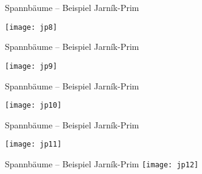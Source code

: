 \begin{frame}{Spannbäume – Beispiel Jarník-Prim}
	
		\centering
		\texttt{[image: jp8]}
	
\end{frame}

\begin{frame}{Spannbäume – Beispiel Jarník-Prim}
	
		\centering
		\texttt{[image: jp9]}
	
\end{frame}

\begin{frame}{Spannbäume – Beispiel Jarník-Prim}
	
		\centering
		\texttt{[image: jp10]}
	
\end{frame}

\begin{frame}{Spannbäume – Beispiel Jarník-Prim}
	
		\centering
		\texttt{[image: jp11]}
	
\end{frame}

\begin{frame}{\hypertarget{label:afterEx1}{}Spannbäume – Beispiel Jarník-Prim}
		\centering
		\texttt{[image: jp12]}
\end{frame}